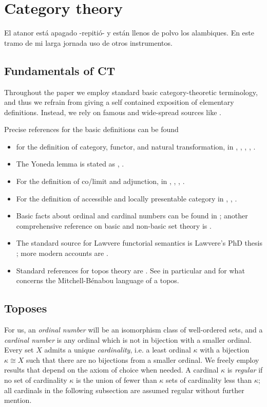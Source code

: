\section{Category theory}
\epigraph{El atanor está apagado -repitió- y están llenos de polvo los alambiques. En este tramo
	de mi larga jornada uso de otros instrumentos.}{\cite{arena}}
\subsection{Fundamentals of CT}
Throughout the paper we employ standard basic category-theoretic terminology, and thus we refrain from giving a self contained exposition of elementary definitions. Instead, we rely on famous and wide-spread sources like \cite{Bor1,Bor2,McL,riehlcontext,leinster2014basic,simmons2011introduction}.

Precise references for the basic definitions can be found
\begin{itemize}
	\item for the definition of category, functor, and natural transformation, in \cite[1.2.1]{Bor1}, \cite[I.2]{McL}, \cite[1.2.2]{Bor1}, \cite[I.3]{McL}, \cite[1.3.1]{Bor1}.
	\item The Yoneda lemma is stated as \cite[1.3.3]{Bor1}, \cite[III.2]{McL}.
	\item For the definition of co/limit and adjunction, in \cite[2.6.2]{Bor1}, \cite[III.3]{McL}, \cite[2.6.6]{Bor1}, \cite[III.4]{McL}.
	\item For the definition of accessible and locally presentable category in \cite[5.3.1]{Bor2}, \cite[5.2.1]{Bor2}, \cite{Adamek1994}.%
	\item Basic facts about ordinal and cardinal numbers can be found in \cite{kunen}; another comprehensive reference on basic and non-basic set theory is \cite{jech2013set}.
	\item The standard source for Lawvere functorial semantics is Lawvere's PhD thesis \cite{lawvere1963functorial}; more modern accounts are \cite{hyland2007category}.
	\item Standard references for topos theory are \cite{mac1992sheaves,JohnstonePT}. See in particular \cite[VI.5]{mac1992sheaves} and \cite[5.4]{JohnstonePT} for what concerns the Mitchell-Bénabou language of a topos.
\end{itemize}
\subsection{Toposes}\leavevmode
For us, an \emph{ordinal number} will be an isomorphism class of well\hyp{}ordered sets, and a \emph{cardinal number} is any ordinal which is not in bijection with a smaller ordinal. Every set $X$ admits a unique \emph{cardinality}, i.e. a least ordinal $\kappa$ with a bijection $\kappa \cong X$ such that there are no bijections from a smaller ordinal. We freely employ results that depend on the axiom of choice when needed. A cardinal $\kappa$ is \emph{regular} if no set of cardinality $\kappa$ is the union of fewer than $\kappa$ sets of cardinality less than $\kappa$; all cardinals in the following subsection are assumed regular without further mention.

